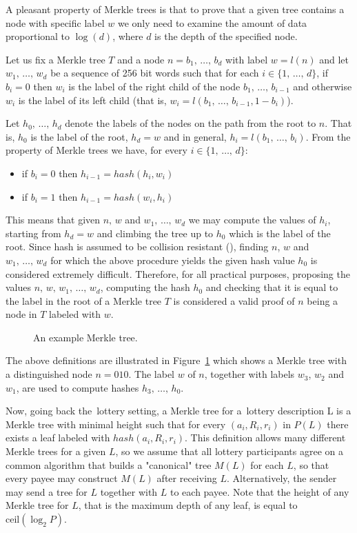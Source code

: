 \documentclass[a4paper]{article}
\begin{document}
    A pleasant property of Merkle trees is that to prove that a given tree contains a node with specific label $w$
    we only need to examine the amount of data proportional to $\log(d)$, where $d$ is the depth of the specified node.

    Let us fix a Merkle tree $T$ and a node $n = b_1,\,\ldots,\,b_d$ with label $w = l(n)$ and let $w_1,\,\ldots,\,w_d$
    be a sequence of 256 bit words such that for each $i \in \{1,\,\ldots,\,d\}$, if $b_i = 0$ then $w_i$ is the label
    of the right child of the node $b_1,\,\ldots,\, b_{i-1}$ and otherwise $w_i$ is the label of its left child
    (that is, $w_i = l(b_1, \,\ldots,\,b_{i-1}, 1 - b_i)$).

    Let $h_0,\,\ldots,\, h_d$ denote the labels of the nodes on the path from the root to $n$. That is, $h_0$ is
    the label of the root, $h_d = w$ and in general, $h_i = l(b_1,\,\ldots,\,b_i)$. From the property of Merkle trees
    we have, for every $i \in \{1,\,\ldots,\,d\}$:
    \begin{itemize}
        \item if $b_i = 0$ then $h_{i-1} = hash(h_i, w_i)$
        \item if $b_i = 1$ then $h_{i-1} = hash(w_i, h_i)$
    \end{itemize}
    This means that given $n,\, w$ and $w_1,\,\ldots,\,w_d$ we may compute the values of $h_i$, starting from $h_d = w$
    and climbing the tree up to $h_0$ which is the label of the root. Since hash is assumed to be collision resistant
    (\cite{SHA3}), finding $n$, $w$ and $w_1,\,\ldots,\,w_d$ for which the above procedure yields the given
    hash value $h_0$ is considered extremely difficult. Therefore, for all practical purposes, proposing the values
    $n,\,w,\,w_1,\,\ldots,\,w_d$, computing the hash $h_0$ and checking that it is equal to the label in the root of
    a Merkle tree $T$ is considered a valid proof of $n$ being a node in $T$ labeled with $w$.

    \begin{figure}
        
        \caption{An example Merkle tree.}
        \label{fig:merkle}
    \end{figure}

    The above definitions are illustrated in Figure~\ref{fig:merkle} which shows a Merkle tree with a distinguished
    node $n = 010$. The label $w$ of $n$, together with labels $w_3$, $w_2$ and $w_1$, are used to compute hashes
    $h_3, \,\ldots, \,h_0$.


    Now, going back the~lottery setting, a Merkle tree for a~lottery description L is a Merkle tree with minimal height
    such that for every $(a_i, R_i, r_i)$ in $P(L)$ there exists a leaf labeled with $hash(a_i, R_i, r_i)$.
    This definition allows many different Merkle trees for a given $L$, so we assume that all lottery participants
    agree on a common algorithm that builds a "canonical" tree $M(L)$ for each $L$, so that every payee may construct
    $M(L)$ after receiving $L$. Alternatively, the sender may send a tree for $L$ together with $L$ to each payee.
    Note that the height of any Merkle tree for $L$, that is the maximum depth of any leaf, is equal to
    $\text{ceil}(\log_2 P)$.
\end{document}
